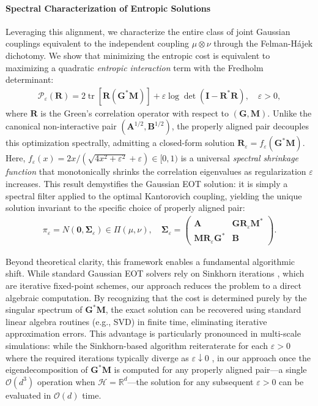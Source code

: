 \documentclass[noinfoline]{imsart}\setcounter{tocdepth}{2}
\renewcommand{\b}[1]{\mathbb{#1}}
\newcommand{\m}[1]{\mathbf{#1}}
\renewcommand{\c}[1]{\mathcal{#1}}
\DeclareMathOperator{\tr}{tr}
\theoremstyle{plain}
\begin{document}
\paragraph{Spectral Characterization of Entropic Solutions} Leveraging this alignment, we characterize the entire class of joint Gaussian couplings equivalent to the independent coupling $\mu \otimes \nu$ through the Felman-H\'{a}jek dichotomy. We show that minimizing the entropic cost is equivalent to maximizing a quadratic \emph{entropic interaction} term with the Fredholm determinant:
\begin{align*}
    \c{P}_{\varepsilon}(\m{R}) = 2 \tr [\m{R} (\m{G}^{*} \m{M})] + \varepsilon \log \det(\m{I} - \m{R}^* \m{R}), \quad \varepsilon > 0,
\end{align*}
where $\m{R}$ is the Green's correlation operator with respect to $(\m{G}, \m{M})$. Unlike the canonical non-interactive pair $(\m{A}^{1/2}, \m{B}^{1/2})$, the properly aligned pair decouples this optimization spectrally, admitting a closed-form solution $\m{R}_{\varepsilon} = f_{\varepsilon} (\m{G}^{*} \m{M})$. Here, $f_{\varepsilon}(x) = 2x/(\sqrt{4x^{2}+\varepsilon^{2}}+\varepsilon) \in [0, 1)$ is a universal \textit{spectral shrinkage function} that monotonically shrinks the correlation eigenvalues as regularization $\varepsilon$ increases. This result demystifies the Gaussian EOT solution: it is simply a spectral filter applied to the optimal Kantorovich coupling, yielding the unique solution invariant to the specific choice of properly aligned pair:
\begin{align*}
    \pi_{\varepsilon} = N(\m{0}, \m{\Sigma}_{\varepsilon}) \in \Pi(\mu, \nu), \quad \m{\Sigma}_{\varepsilon} = \left(
    \begin{array}{c|c}
    \m{A} & \m{G} \m{R}_{\varepsilon} \m{M}^* \\
    \hline
    \m{M} \m{R}_{\varepsilon} \m{G}^* & \m{B}
    \end{array}
    \right).
\end{align*}

Beyond theoretical clarity, this framework enables a fundamental algorithmic shift. While standard Gaussian EOT solvers rely on Sinkhorn iterations \cite{janati2020entropic, mallasto2022entropy}, which are iterative fixed-point schemes, our approach reduces the problem to a direct algebraic computation. By recognizing that the cost is determined purely by the singular spectrum of $\m{G}^{*} \m{M}$, the exact solution can be recovered using standard linear algebra routines (e.g., SVD) in finite time, eliminating iterative approximation errors. This advantage is particularly pronounced in multi-scale simulations: while the Sinkhorn-based algorithm reiteraterate for each $\varepsilon > 0$ where the required iterations typically diverge as $\varepsilon \downarrow 0$ \cite{cuturi2013sinkhorn, ghosal2025convergence, chizat2020faster}, in our approach once the eigendecomposition of $\m{G}^{*} \m{M}$ is computed for any properly aligned pair—a single $\c{O}(d^{3})$ operation when $\c{H} = \b{R}^{d}$—the solution for any subsequent $\varepsilon > 0$ can be evaluated in $\c{O}(d)$ time.
\end{document}
